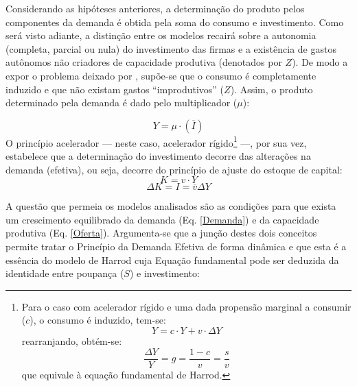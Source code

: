 Considerando as hipóteses anteriores, a determinação do produto pelos componentes da demanda é obtida pela soma do consumo e investimento. Como será visto adiante, a distinção entre os modelos recairá sobre a autonomia (completa, parcial ou nula) do investimento das firmas e a existência de gastos autônomos não criadores de capacidade produtiva (denotados por $Z$). De modo a expor o problema deixado por \textcite{harrod_essay_1939}, supõe-se que o consumo é completamente induzido e que não existam gastos ``improdutivos'' ($Z$). Assim, o produto determinado pela demanda é dado pelo multiplicador ($\mu$):

\begin{equation}
\label{Demanda}
Y = \mu\cdot (\overline I)
\end{equation}
O princípio acelerador --- neste caso, acelerador rígido\footnote{Para o caso com acelerador rígido e uma dada propensão marginal a consumir ($c$), o consumo é induzido, tem-se:
	$$
	Y = c\cdot Y + v\cdot \Delta Y
	$$
	rearranjando, obtém-se:
	$$
	\frac{\Delta Y}{Y} = g = \frac{1 - c}{v} = \frac{s}{v}
	$$
	que equivale à equação fundamental de Harrod.
} ---, por sua vez, estabelece que a determinação do investimento decorre das alterações na demanda (efetiva), ou seja, decorre do princípio de ajuste do estoque de capital:
$$
K = v\cdot Y
$$
\begin{equation}
\Delta K = I = \overline{v}\Delta Y
\end{equation}


A questão que permeia os modelos analisados são as condições para que exista um crescimento equilibrado da demanda (Eq. \ref{Demanda}) e da capacidade produtiva (Eq. \ref{Oferta}). 
Argumenta-se que a junção destes dois conceitos permite tratar o Princípio da Demanda Efetiva de forma dinâmica e que esta é a essência do modelo de Harrod cuja Equação fundamental pode ser deduzida da identidade entre poupança ($S$) e investimento:

